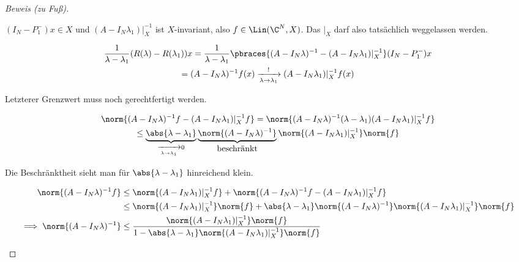 \begin{proof}[Beweis (zu Fuß)]
\begin{enumerate}[label = (\roman*)]
        $(I_N - P_1^-) x \in X$ und $(A - I_N \lambda_1) |_X^{-1}$ ist $X$-invariant, also $f \in \Lin(\C^N, X)$.
        Das $|_X$ darf also tatsächlich weggelassen werden.

        \begin{multline*}
            \frac{1}{\lambda - \lambda_1}
            (R(\lambda) - R(\lambda_1)) x
            =
            \frac{1}{\lambda - \lambda_1}
            \pbraces
            {
                (A - I_N \lambda)^{-1}
                -
                (A - I_N \lambda_1) |_X^{-1}
            }
            (I_N - P_1^-)
            x \\
            =
            (A - I_N \lambda)^{-1} f(x)
            \xrightarrow[\lambda \to \lambda_1]{!}
            (A - I_N \lambda_1) |_X^{-1} f(x)
        \end{multline*}

        Letzterer Grenzwert muss noch gerechtfertigt werden.

        \begin{multline*}
            \norm
            {
                (A - I_N \lambda)^{-1} f
                -
                (A - I_N \lambda_1) |_X^{-1} f
            }
            =
            \norm
            {
                (A - I_N \lambda)^{-1}
                (\lambda - \lambda_1)
                (A - I_N \lambda_1) |_X^{-1}
                f
            } \\
            \leq
            \underbrace
            {
                \abs{\lambda - \lambda_1}
            }_{
                \xrightarrow[\lambda \to \lambda_1]{} 0
            }
            \underbrace
            {
                \norm{(A - I_N \lambda)^{-1}}
            }_{
                \displaystyle
                \text{beschränkt}
            }
            \norm{(A - I_N \lambda_1) |_X^{-1}}
            \norm{f}
        \end{multline*}

        Die Beschränktheit sieht man für $\abs{\lambda - \lambda_1}$ hinreichend klein.

        \begin{align*}
            \norm{(A - I_N \lambda)^{-1} f}
            & \leq
            \norm{(A - I_N \lambda_1) |_X^{-1} f}
            +
            \norm
            {
                (A - I_N \lambda)^{-1} f
                -
                (A - I_N \lambda_1) |_X^{-1} f
            } \\
            & \leq
            \norm{(A - I_N \lambda_1) |_X^{-1}}
            \norm{f}
            +
            \abs{\lambda - \lambda_1}
            \norm{(A - I_N \lambda)^{-1}}
            \norm{(A - I_N \lambda_1) |_X^{-1}}
            \norm{f} \\
            \implies
            \norm{(A - I_N \lambda)^{-1}}
            & \leq
            \frac
            {
                \norm{(A - I_N \lambda_1) |_X^{-1}}
                \norm{f}
            }{
                1
                -
                \abs{\lambda - \lambda_1}
                \norm{(A - I_N \lambda_1) |_X^{-1}}
                \norm{f}
            }
        \end{align*}


\end{enumerate}
\end{proof}
